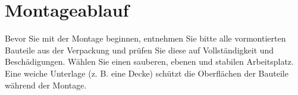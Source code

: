 %
%
%

\chapter{Montageablauf}

Bevor Sie mit der Montage beginnen, entnehmen Sie bitte alle vormontierten Bauteile aus der Verpackung und prüfen Sie diese auf Vollständigkeit und Beschädigungen. Wählen Sie einen sauberen, ebenen und stabilen Arbeitsplatz. Eine weiche Unterlage (z. B. eine Decke) schützt die Oberflächen der Bauteile während der Montage.

